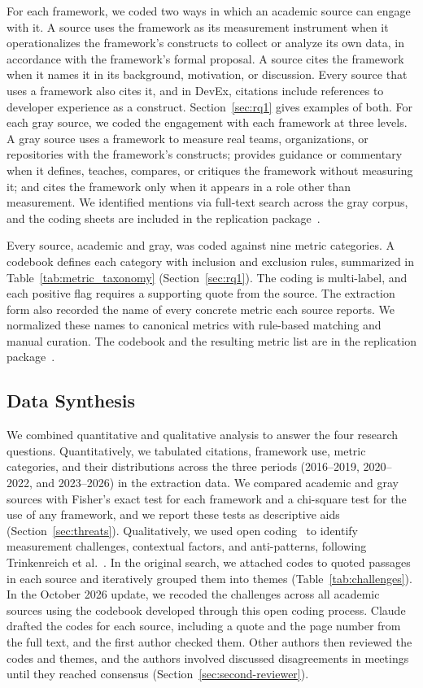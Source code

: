 \documentclass[preprint,number]{elsarticle}
\begin{document}
For each framework, we coded two ways in which an academic source can engage with it. A source uses the framework as its measurement instrument when it operationalizes the framework's constructs to collect or analyze its own data, in accordance with the framework's formal proposal. A source cites the framework when it names it in its background, motivation, or discussion. Every source that uses a framework also cites it, and in DevEx, citations include references to developer experience as a construct. Section~\ref{sec:rq1} gives examples of both. For each gray source, we coded the engagement with each framework at three levels. A gray source uses a framework to measure real teams, organizations, or repositories with the framework's constructs; provides guidance or commentary when it defines, teaches, compares, or critiques the framework without measuring it; and cites the framework only when it appears in a role other than measurement. We identified mentions via full-text search across the gray corpus, and the coding sheets are included in the replication package~\cite{replication2026}.

Every source, academic and gray, was coded against nine metric categories. A codebook defines each category with inclusion and exclusion rules, summarized in Table~\ref{tab:metric_taxonomy} (Section~\ref{sec:rq1}). The coding is multi-label, and each positive flag requires a supporting quote from the source. The extraction form also recorded the name of every concrete metric each source reports. We normalized these names to canonical metrics with rule-based matching and manual curation. The codebook and the resulting metric list are in the replication package~\cite{replication2026}.

\subsection{Data Synthesis}
\label{sec:synthesis}

We combined quantitative and qualitative analysis to answer the four research questions. Quantitatively, we tabulated citations, framework use, metric categories, and their distributions across the three periods (2016--2019, 2020--2022, and 2023--2026) in the extraction data. We compared academic and gray sources with Fisher's exact test for each framework and a chi-square test for the use of any framework, and we report these tests as descriptive aids (Section~\ref{sec:threats}). Qualitatively, we used open coding~\cite{strauss1998basics} to identify measurement challenges, contextual factors, and anti-patterns, following Trinkenreich et al.~\cite{trinkenreich2022women}. In the original search, we attached codes to quoted passages in each source and iteratively grouped them into themes (Table~\ref{tab:challenges}). In the October 2026 update, we recoded the challenges across all academic sources using the codebook developed through this open coding process. Claude drafted the codes for each source, including a quote and the page number from the full text, and the first author checked them. Other authors then reviewed the codes and themes, and the authors involved discussed disagreements in meetings until they reached consensus (Section~\ref{sec:second-reviewer}).
\end{document}

